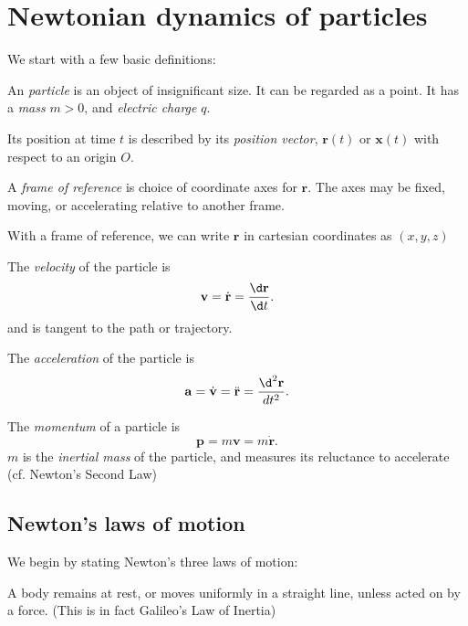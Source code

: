 \documentclass[a4paper]{article}
\begin{document}
\tableofcontents
\section{Newtonian dynamics of particles}
We start with a few basic definitions:
\begin{defi}[Particle]
  An \emph{particle} is an object of insignificant size. It can be regarded as a point. It has a \emph{mass} $m > 0$, and \emph{electric charge} $q$.

  Its position at time $t$ is described by its \emph{position vector}, $\mathbf{r}(t)$ or $\mathbf{x}(t)$ with respect to an origin $O$.
\end{defi}

\begin{defi}
  A \emph{frame of reference} is choice of coordinate axes for $\mathbf{r}$. The axes may be fixed, moving, or accelerating relative to another frame.

  With a frame of reference, we can write $\mathbf{r}$ in cartesian coordinates as $(x, y, z)$
\end{defi}

\begin{defi}[Velocity]
  The \emph{velocity} of the particle is
  \[
    \mathbf{v} = \dot{\mathbf{r}} = \frac{\d \mathbf{r}}{\d t}.
  \]
  and is tangent to the path or trajectory.
\end{defi}

\begin{defi}[Acceleration]
  The \emph{acceleration} of the particle is
  \[
    \mathbf{a} = \dot{\mathbf{v}} = \ddot{\mathbf{r}} = \frac{\d^2 \mathbf{r}}{d t^2}.
  \]
\end{defi}

\begin{defi}[Momentum]
  The \emph{momentum} of a particle is
  \[
    \mathbf{p} = m\mathbf{v} = m\dot{\mathbf{r}}.
  \]
  $m$ is the \emph{inertial mass} of the particle, and measures its reluctance to accelerate (cf. Newton's Second Law)
\end{defi}

\subsection{Newton's laws of motion}
We begin by stating Newton's three laws of motion:
\begin{law}
  A body remains at rest, or moves uniformly in a straight line, unless acted on by a force. (This is in fact Galileo's Law of Inertia)
\end{law}
\end{document}
